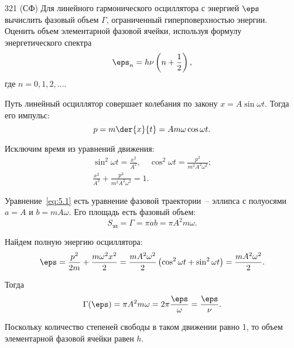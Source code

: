 \documentclass[pscyr]{hedwork}
\begin{document}
  \begin{task}{321 (СФ)}{
    Для линейного гармонического осциллятора с энергией \( \eps \) вычислить
    фазовый объем \( \Gamma \), ограниченный гиперповерхностью энергии. Оценить
    объем элементарной фазовой ячейки, используя формулу энергетического спектра
    \[
      \eps_n = h\nu \left(n + \frac{1}{2}\right),
    \]
    где \( n = 0, 1, 2, \ldots \).
  }
  
    Путь линейный осциллятор совершает колебания по закону
    \( x = A\sin\omega t \). Тогда его импульс:
    \[
      p = m\der{x}{t} = Am\omega\cos\omega t.
    \]
    
    Исключим время из уравнений движения:
    \begin{gather}
      \sin^2\omega t = \frac{x^2}{A^2}, \quad \cos^2\omega t =
        \frac{p^2}{m^2A^2\omega^2}; \nonumber \\
      \frac{x^2}{A^2} + \frac{p^2}{m^2A^2\omega^2} = 1. \label{eq:5.1}
    \end{gather}
    
    Уравнение~\eqref{eq:5.1} есть уравнение фазовой траектории~-- эллипса с
    полуосями \( a = A \) и \( b = mA\omega \). Его площадь есть фазовый объем:
    \[
      S_\text{эл} = \Gamma = \pi ab = \pi A^2m\omega.
    \]
    
    Найдем полную энергию осциллятора:
    \[
      \eps = \frac{p^2}{2m} + \frac{m\omega^2x^2}{2} =
        \frac{mA^2\omega^2}{2}\left(\cos^2\omega t + \sin^2\omega t\right) =
        \frac{mA^2\omega^2}{2}.
    \]
    
    Тогда
    \[
      \Gamma(\eps) = \pi A^2m\omega = 2\pi\frac{\eps}{\omega} =
        \frac{\eps}{\nu}.
    \]
    
    Поскольку количество степеней свободы в таком движении равно 1, то
    объем элементарной фазовой ячейки равен \( h \).

  \end{task}
\end{document}
